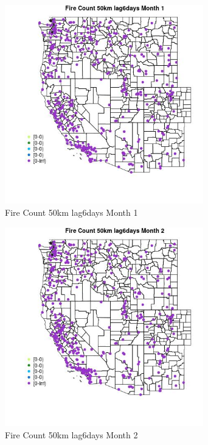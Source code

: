 \begin{figure} 
\centering  
\includegraphics[width=0.77\textwidth]{Code_Outputs/Report_ML_input_PM25_Step4_part_e_de_duplicated_aves_compiled_2019-05-18wNAs_MapObsMo1Fire_Count_50km_lag6days.jpg} 
\caption{\label{fig:Report_ML_input_PM25_Step4_part_e_de_duplicated_aves_compiled_2019-05-18wNAsMapObsMo1Fire_Count_50km_lag6days}Fire Count 50km lag6days Month 1} 
\end{figure} 
 

\clearpage 

\begin{figure} 
\centering  
\includegraphics[width=0.77\textwidth]{Code_Outputs/Report_ML_input_PM25_Step4_part_e_de_duplicated_aves_compiled_2019-05-18wNAs_MapObsMo2Fire_Count_50km_lag6days.jpg} 
\caption{\label{fig:Report_ML_input_PM25_Step4_part_e_de_duplicated_aves_compiled_2019-05-18wNAsMapObsMo2Fire_Count_50km_lag6days}Fire Count 50km lag6days Month 2} 
\end{figure} 
 


